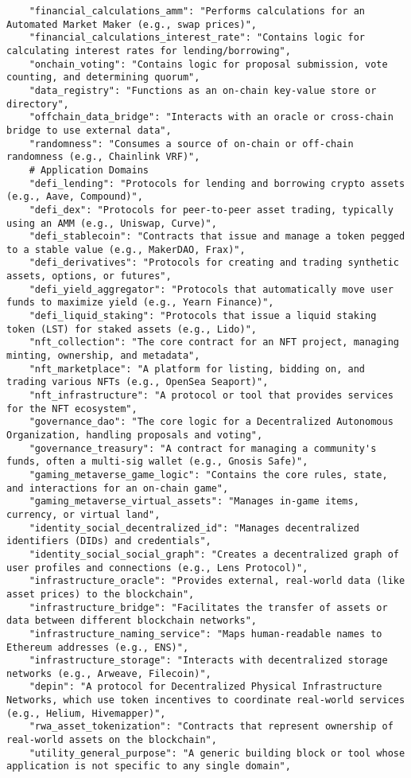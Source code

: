 \begin{lstlisting}
    "financial_calculations_amm": "Performs calculations for an Automated Market Maker (e.g., swap prices)",
    "financial_calculations_interest_rate": "Contains logic for calculating interest rates for lending/borrowing",
    "onchain_voting": "Contains logic for proposal submission, vote counting, and determining quorum",
    "data_registry": "Functions as an on-chain key-value store or directory",
    "offchain_data_bridge": "Interacts with an oracle or cross-chain bridge to use external data",
    "randomness": "Consumes a source of on-chain or off-chain randomness (e.g., Chainlink VRF)",
    # Application Domains
    "defi_lending": "Protocols for lending and borrowing crypto assets (e.g., Aave, Compound)",
    "defi_dex": "Protocols for peer-to-peer asset trading, typically using an AMM (e.g., Uniswap, Curve)",
    "defi_stablecoin": "Contracts that issue and manage a token pegged to a stable value (e.g., MakerDAO, Frax)",
    "defi_derivatives": "Protocols for creating and trading synthetic assets, options, or futures",
    "defi_yield_aggregator": "Protocols that automatically move user funds to maximize yield (e.g., Yearn Finance)",
    "defi_liquid_staking": "Protocols that issue a liquid staking token (LST) for staked assets (e.g., Lido)",
    "nft_collection": "The core contract for an NFT project, managing minting, ownership, and metadata",
    "nft_marketplace": "A platform for listing, bidding on, and trading various NFTs (e.g., OpenSea Seaport)",
    "nft_infrastructure": "A protocol or tool that provides services for the NFT ecosystem",
    "governance_dao": "The core logic for a Decentralized Autonomous Organization, handling proposals and voting",
    "governance_treasury": "A contract for managing a community's funds, often a multi-sig wallet (e.g., Gnosis Safe)",
    "gaming_metaverse_game_logic": "Contains the core rules, state, and interactions for an on-chain game",
    "gaming_metaverse_virtual_assets": "Manages in-game items, currency, or virtual land",
    "identity_social_decentralized_id": "Manages decentralized identifiers (DIDs) and credentials",
    "identity_social_social_graph": "Creates a decentralized graph of user profiles and connections (e.g., Lens Protocol)",
    "infrastructure_oracle": "Provides external, real-world data (like asset prices) to the blockchain",
    "infrastructure_bridge": "Facilitates the transfer of assets or data between different blockchain networks",
    "infrastructure_naming_service": "Maps human-readable names to Ethereum addresses (e.g., ENS)",
    "infrastructure_storage": "Interacts with decentralized storage networks (e.g., Arweave, Filecoin)",
    "depin": "A protocol for Decentralized Physical Infrastructure Networks, which use token incentives to coordinate real-world services (e.g., Helium, Hivemapper)",
    "rwa_asset_tokenization": "Contracts that represent ownership of real-world assets on the blockchain",
    "utility_general_purpose": "A generic building block or tool whose application is not specific to any single domain",
\end{lstlisting}